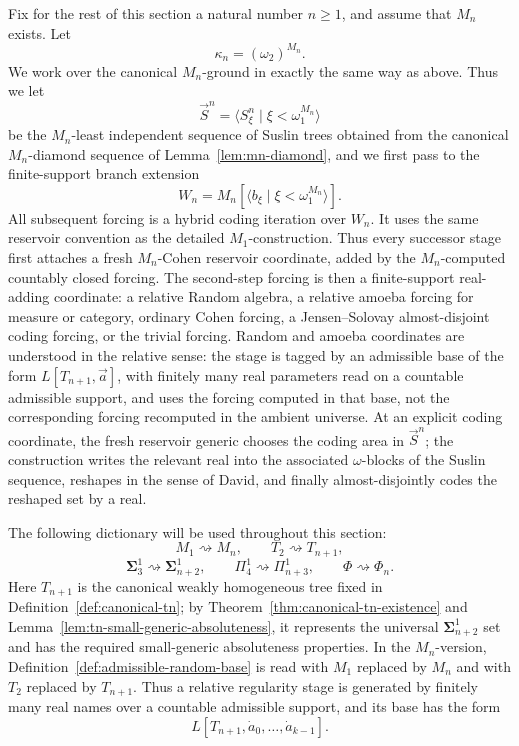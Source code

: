\documentclass[a4paper,11pt]{article}
\begin{document}
Fix for the rest of this section a natural number $n\geq 1$, and assume that $M_n$ exists.  Let
\[
   \kappa_n=(\omega_2)^{M_n}.
\]
We work over the canonical $M_n$-ground in exactly the same way as above.  Thus we let
\[
   \vec S^n=\langle S^n_\xi\mid \xi<\omega_1^{M_n}\rangle
\]
be the $M_n$-least independent sequence of Suslin trees obtained from the canonical $M_n$-diamond sequence of Lemma~\ref{lem:mn-diamond}, and we first pass to the finite-support branch extension
\[
   W_n=M_n[\langle b_\xi\mid \xi<\omega_1^{M_n}\rangle].
\]
All subsequent forcing is a hybrid coding iteration over $W_n$.  It uses the same reservoir convention as the detailed $M_1$-construction.  Thus every successor stage first attaches a fresh $M_n$-Cohen reservoir coordinate, added by the $M_n$-computed countably closed forcing.  The second-step forcing is then a finite-support real-adding coordinate: a relative Random algebra, a relative amoeba forcing for measure or category, ordinary Cohen forcing, a Jensen--Solovay almost-disjoint coding forcing, or the trivial forcing.  Random and amoeba coordinates are understood in the relative sense: the stage is tagged by an admissible base of the form $L[T_{n+1},\vec a]$, with finitely many real parameters read on a countable admissible support, and uses the forcing computed in that base, not the corresponding forcing recomputed in the ambient universe.  At an explicit coding coordinate, the fresh reservoir generic chooses the coding area in $\vec S^n$; the construction writes the relevant real into the associated $\omega$-blocks of the Suslin sequence, reshapes in the sense of David, and finally almost-disjointly codes the reshaped set by a real.

The following dictionary will be used throughout this section:
\[
   M_1\rightsquigarrow M_n,
   \qquad
   T_2\rightsquigarrow T_{n+1},
\]
\[
   \boldsymbol\Sigma^1_3\rightsquigarrow \boldsymbol\Sigma^1_{n+2},
   \qquad
   \Pi^1_4\rightsquigarrow \Pi^1_{n+3},
   \qquad
   \Phi\rightsquigarrow \Phi_n.
\]
Here $T_{n+1}$ is the canonical weakly homogeneous tree fixed in Definition~\ref{def:canonical-tn}; by Theorem~\ref{thm:canonical-tn-existence} and Lemma~\ref{lem:tn-small-generic-absoluteness}, it represents the universal $\boldsymbol\Sigma^1_{n+2}$ set and has the required small-generic absoluteness properties.  In the $M_n$-version, Definition~\ref{def:admissible-random-base} is read with $M_1$ replaced by $M_n$ and with $T_2$ replaced by $T_{n+1}$.  Thus a relative regularity stage is generated by finitely many real names over a countable admissible support, and its base has the form
\[
   L[T_{n+1},\dot a_0,\ldots,\dot a_{k-1}].
\]
\end{document}
